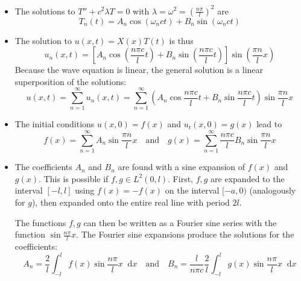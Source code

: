 \documentclass[11pt, a4paper]{article}
\newcommand{\diff}{\mathop{}\!\mathrm{d}} %
\begin{document}
\begin{itemize}
  	\item The solutions to $ T'' + c^{2}\lambda T = 0 $ with $ \lambda = \omega^{2} = \left(\frac{n\pi}{l}\right)^{2} $ are
  	\begin{equation*}
  		T_{n}(t) = A_n \cos(\omega_n c t ) + B_n \sin( \omega_n c t)
  	\end{equation*}
  	
  	\item The solution to $ u(x, t) = X(x)T(t) $ is thus
  	\begin{equation*}
  		u_{n}(x, t) = \left[A_n \cos(\frac{n\pi c}{l} t ) + B_n \sin( \frac{n\pi c}{l} t)\right] \sin (\frac{\pi n}{l} x)
  	\end{equation*}
  	Because the wave equation is linear, the general solution is a linear superposition of the solutions:
  	\begin{equation*}
  		u(x, t) = \sum_{n=1}^{\infty} u_{n}(x, t) = \sum_{n=1}^{\infty}\left(A_n \cos \frac{n\pi c}{l} t  + B_n \sin \frac{n\pi c}{l} t\right)\sin\frac{\pi n}{l} x
  	\end{equation*}
  
  	\item The initial conditions $ u(x, 0) = f(x) $ and $ u_{t}(x, 0) = g(x) $ lead to
  	\begin{equation*}
  		f(x) = \sum_{n=1}^{\infty} A_n \sin\frac{\pi n}{l} x \quad \text{and} \quad g(x) = \sum_{n=1}^{\infty} \frac{n\pi c}{l} B_n  \sin\frac{\pi n}{l} x
  	\end{equation*}
  	
  	\item The coefficients $ A_{n} $ and $ B_{n} $ are found with a sine expansion of $ f(x) $ and $ g(x) $. This is possible if $ f, g \in L^{2}(0, l) $. First, $ f, g $ are expanded to the interval $ [-l, l] $ using $ f(x) = -f(x)$ on the interval $ [-a, 0) $ (analogously for $ g $), then expanded onto the entire real line with period $ 2l $. 
  	
  	The functions $ f, g $ can then be written as a Fourier sine series with the function $ \sin \frac{n \pi}{l}x $. The Fourier sine expansions produce the solutions for the coefficients:
  	\begin{equation*}
  		A_{n} = \frac{2}{l}\int_{-l}^{l}f(x) \sin \frac{n \pi}{l}x \diff x \quad \text{and} \quad B_n = \frac{l}{n\pi c} \frac{2}{l}\int_{-l}^{l}g(x) \sin \frac{n \pi}{l}x \diff x
  	\end{equation*}
\end{itemize}
\end{document}
